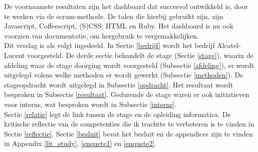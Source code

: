 \documentclass[10pt,a4paper]{article}
\begin{document}
De voornaamste resultaten zijn het dashboard dat succesvol ontwikkeld is, door te werken via de scrum-methode. De talen die hierbij gebruikt zijn, zijn Javascript, Coffeescript, (S)CSS, HTML en Ruby. Het dashboard is nu ook voorzien van documentatie, om hergebruik te vergemakkelijken.\\

Dit verslag is als volgt ingedeeld. In Sectie \ref{bedrijf} wordt het bedrijf Alcatel-Lucent voorgesteld. De derde sectie behandelt de stage (Sectie \ref{stage}), waarin de afdeling waar de stage doorging wordt voorgesteld (Subsectie \ref{afdeling}), er wordt uitgelegd volens welke methoden er wordt gewerkt (Subsectie \ref{methoden}). De stageopdracht wordt uitgelegd in Subsectie \ref{opdracht}. Het resultaat wordt besproken in Subsectie \ref{resultaat}. Gedurende de stage waren er ook initiatieven voor interns, wat besproken wordt in Subsectie \ref{interns}.\\
Sectie \ref{relatie} legt de link tussen de stage en de opleiding informatica. De kritische reflectie van de competenties die ik trachtte te verbeteren is te vinden in Sectie \ref{reflectie}. Sectie \ref{besluit} bevat het besluit en de appendices zijn te vinden in Appendix \ref{lit_study}, \ref{enquete1} en \ref{enquete2}. 
\end{document}
